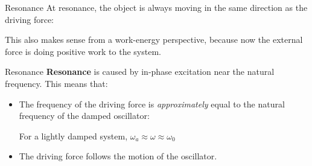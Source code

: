 \documentclass[12pt,compress,aspectratio=169]{beamer}
\begin{document}
\begin{frame}{Resonance}
  At resonance, the object is always moving in the same direction as the
  driving force:

  \vspace{-.3in}{\large
    \begin{align*}
      v(t)&=A\omega_a\cos(\omega_a t)\\
      F_a(t)&=F\cos(\omega_a t)
    \end{align*}
  }

  This also makes sense from a work-energy perspective, because now the
  external force is doing positive work to the system.
\end{frame}



\begin{frame}{Resonance}
  \textbf{Resonance} is caused by in-phase excitation near the natural
  frequency. This means that:
  \begin{itemize}
  \item The frequency of the driving force is \emph{approximately} equal to the
    natural frequency of the damped oscillator:


    For a lightly damped system, $\omega_a\approx\omega\approx\omega_0$
  \item The driving force follows the motion of the oscillator.
  \end{itemize}
\end{frame}
\end{document}
